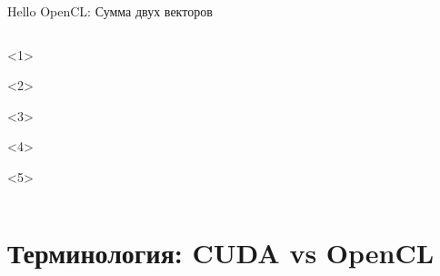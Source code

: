 \documentclass[@BEAMER_OPTIONS@]{beamer}
\begin{document}
\begin{frame}[fragile]{Hello OpenCL: Сумма двух векторов}
\begin{columns}
\begin{column}{0.7\textwidth}
\begin{minipage}[c][\textheight][c]{\linewidth}
                \begin{exampleblock}{\small%
                    }
                    \begin{adjustbox}{width=0.7\textwidth, height=\textheight, keepaspectratio}
                        \begin{minipage}{\textwidth}
                            \begin{onlyenv}<1>
                                
                            \end{onlyenv}
                            \begin{onlyenv}<2>
                                
                            \end{onlyenv}
                            \begin{onlyenv}<3>
                                
                            \end{onlyenv}
                            \begin{onlyenv}<4>
                                
                            \end{onlyenv}
                            \begin{onlyenv}<5>
                                
                            \end{onlyenv}
                        \end{minipage}
                    \end{adjustbox}
                \end{exampleblock}
            \end{minipage}
        \end{column}
    \end{columns}
\end{frame}

\section{Терминология: CUDA vs OpenCL}
\end{document}
